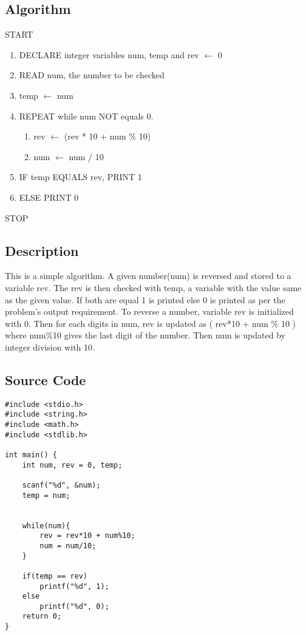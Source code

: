 \documentclass{article}
\begin{document}
\subsection{Algorithm}
START
\begin{flushleft}
\begin{enumerate}
    \item DECLARE integer variables num, temp and rev $\leftarrow$ 0
    \item READ num, the number to be checked
    \item temp $\leftarrow$ num
    \item REPEAT while num NOT equals 0.
    \begin{enumerate}
        \item rev $\leftarrow$ (rev * 10 + num \% 10)
        \item num $\leftarrow$ num / 10
    \end{enumerate}
    \item IF temp EQUALS rev, PRINT 1
    \item ELSE PRINT 0
\end{enumerate}
\end{flushleft}
STOP
\subsection{Description}
This is a simple algorithm. A given number(num) is reversed and stored to a variable rev. The rev is then checked with temp, a variable with the value same as the given value. If both are equal 1 is printed else 0 is printed as per the problem's output requirement. \newline
To reverse a number, variable rev is initialized with 0. Then for each digits in num, rev is updated as ( rev*10 + num \% 10 ) where num\%10 gives the last digit of the number. Then num is updated by integer division with 10.
\subsection{Source Code}
\begin{verbatim}
#include <stdio.h>
#include <string.h>
#include <math.h>
#include <stdlib.h>

int main() {
    int num, rev = 0, temp;

    scanf("%d", &num);
    temp = num;


    while(num){
        rev = rev*10 + num%10;
        num = num/10;
    }
    
    if(temp == rev)
        printf("%d", 1);
    else
        printf("%d", 0);
    return 0;
}
\end{verbatim}
\newpage
\end{document}
